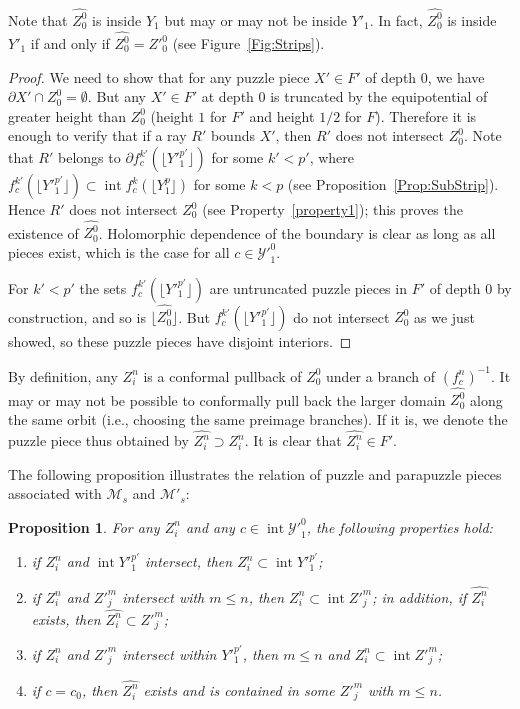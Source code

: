 \documentclass[12pt,a4paper]{amsart}
\newtheorem{proposition}[theorem]{Proposition}
\newcommand{\MM}{\mathcal M}
\newcommand{\MMp}{\mathcal M'}
\newcommand{\YYp}{{\mathcal Y'}}
\newcommand{\intr}{\operatorname{int}}
\begin{document}
Note that $\widehat{Z^0_0}$ is inside $Y_1$ but may or may not be
inside $Y'_1$. In fact, $\widehat{Z^0_0}$ is inside $Y'_1$ if and
only if $\widehat{Z^0_0}=Z'^0_0$ (see Figure~\ref{Fig:Strips}).




\begin{proof}
We need to show that for any puzzle piece $X'\in F'$ of depth $0$,
we have $\partial X'\cap Z^0_0=\emptyset$. But any $X'\in F'$ at
depth $0$ is truncated by
  the equipotential of greater height than $Z^0_0$ (height $1$ for
$F'$ and height $1/2$ for $F$). Therefore it is enough to verify
that
  if a ray $R'$ bounds $X'$,  then $R'$ does not intersect
  $Z^0_0$. Note that $R'$ belongs to $\partial f^{k'}_c\left(\lfloor Y'^{p'}_1\rfloor
 \right)$ for some $k'< p'$, where $f^{k'}_c\left(\lfloor Y'^{p'}_1\rfloor
 \right)\subset \intr f^{k}_c\left(\lfloor Y^{p}_1\rfloor
 \right)$ for some $k<p$ (see Proposition~\ref{Prop:SubStrip}). Hence $R'$ does not
 intersect $Z^0_0$ (see Property~\ref{property1}); this proves the existence
 of $\widehat{Z^0_0}$. Holomorphic dependence of the boundary is clear as long as
 all pieces exist, which is the case for all $c\in \YYp^0_1$.

For $k'<p'$ the sets $f^{k'}_c(\lfloor Y'^{p'}_1\rfloor)$ are
untruncated puzzle pieces in $F'$ of depth $0$ by construction, and
so is $\lfloor \widehat{Z^0_0}\rfloor$. But $f^{k'}_c(\lfloor
Y'^{p'}_1\rfloor)$ do not intersect $Z^0_0$ as we just showed, so
these puzzle pieces have disjoint interiors.
\end{proof}


By definition, any $Z^n_i$ is a conformal pullback of $Z^0_0$ under
a branch of $(f^n_c)^{-1}$. It may or may not be possible to
conformally pull back the larger domain  $\widehat{Z^0_0}$ along the
same orbit (i.e., choosing the same preimage branches). If it is, we
denote the puzzle piece thus obtained by $\widehat{Z^n_i}\supset
Z^n_i$. It is clear that $\widehat{Z^n_i}\in F'$.


The following proposition illustrates the relation of puzzle and
parapuzzle pieces associated with $\MM_s$ and $\MMp_s$:

\begin{proposition}
\label{prop1.0}
  For any $Z^n_i$ and any $c\in \intr \YYp^0_1$, the following properties hold:
\begin{enumerate}
\item
if $Z^n_i$ and $\intr Y'^{p'}_1$ intersect, then $Z^n_i\subset \intr
Y'^{p'}_1$;
\item
if $Z^n_i$ and $Z'^m_j$ intersect with $m\le n$, then $Z^n_i\subset
\intr Z'^m_j$; in addition, if $\widehat{Z^n_i}$ exists, then
$\widehat{Z^n_i}\subset Z'^m_j$;
\item
if $Z^n_i$ and $Z'^m_j$ intersect within $Y'^{p'}_1$, then $m\le n$
and $Z^n_i\subset \intr Z'^m_j$;
\item
if $c=c_0$, then $\widehat{Z^n_i}$ exists and is contained in some
$Z'^m_j$ with $m\le n$.
\end{enumerate}

\end{proposition}
\end{document}
